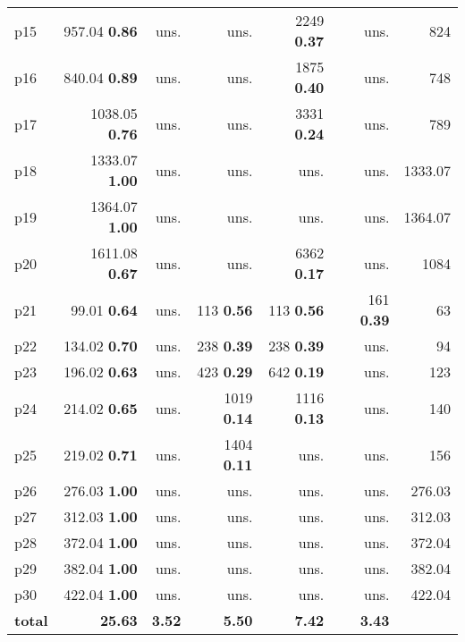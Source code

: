 \begin{tabular}{|l|rrrrr|r|}
p15 & {\footnotesize 957.04} \textbf{0.86} & uns. & uns. & {\footnotesize 2249} \textbf{0.37} & uns. & 824\\
p16 & {\footnotesize 840.04} \textbf{0.89} & uns. & uns. & {\footnotesize 1875} \textbf{0.40} & uns. & 748\\
p17 & {\footnotesize 1038.05} \textbf{0.76} & uns. & uns. & {\footnotesize 3331} \textbf{0.24} & uns. & 789\\
p18 & {\footnotesize 1333.07} \textbf{1.00} & uns. & uns. & uns. & uns. & 1333.07\\
p19 & {\footnotesize 1364.07} \textbf{1.00} & uns. & uns. & uns. & uns. & 1364.07\\
p20 & {\footnotesize 1611.08} \textbf{0.67} & uns. & uns. & {\footnotesize 6362} \textbf{0.17} & uns. & 1084\\
p21 & {\footnotesize 99.01} \textbf{0.64} & uns. & {\footnotesize 113} \textbf{0.56} & {\footnotesize 113} \textbf{0.56} & {\footnotesize 161} \textbf{0.39} & 63\\
p22 & {\footnotesize 134.02} \textbf{0.70} & uns. & {\footnotesize 238} \textbf{0.39} & {\footnotesize 238} \textbf{0.39} & uns. & 94\\
p23 & {\footnotesize 196.02} \textbf{0.63} & uns. & {\footnotesize 423} \textbf{0.29} & {\footnotesize 642} \textbf{0.19} & uns. & 123\\
p24 & {\footnotesize 214.02} \textbf{0.65} & uns. & {\footnotesize 1019} \textbf{0.14} & {\footnotesize 1116} \textbf{0.13} & uns. & 140\\
p25 & {\footnotesize 219.02} \textbf{0.71} & uns. & {\footnotesize 1404} \textbf{0.11} & uns. & uns. & 156\\
p26 & {\footnotesize 276.03} \textbf{1.00} & uns. & uns. & uns. & uns. & 276.03\\
p27 & {\footnotesize 312.03} \textbf{1.00} & uns. & uns. & uns. & uns. & 312.03\\
p28 & {\footnotesize 372.04} \textbf{1.00} & uns. & uns. & uns. & uns. & 372.04\\
p29 & {\footnotesize 382.04} \textbf{1.00} & uns. & uns. & uns. & uns. & 382.04\\
p30 & {\footnotesize 422.04} \textbf{1.00} & uns. & uns. & uns. & uns. & 422.04\\
\hline
\textbf{total} & \textbf{25.63} & \textbf{3.52} & \textbf{5.50} & \textbf{7.42} & \textbf{3.43} & \\
\hline
\end{tabular}


